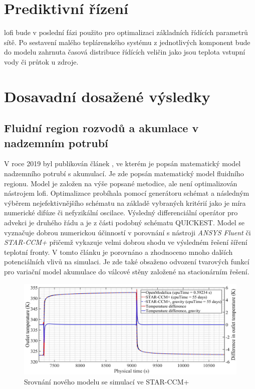 \section{Prediktivní řízení}
\label{sec:MPC}
\acrshort{lofi} bude v poslední fázi použito pro optimalizaci základních
řídících parametrů sítě. Po sestavení malého teplárenského systému z
jednotlivých komponent bude do modelu zahrnuta časová distribuce řídících
veličin jako jsou teplota vstupní vody či průtok u zdroje.
\section{Dosavadní dosažené výsledky}
\label{sec:Finished_parts}
\subsection{Fluidní region rozvodů a akumlace v nadzemním potrubí}
V roce 2019 byl publikován článek \cite{Kudela2019pipe}, ve kterém je popsán
matematický model nadzemního potrubí s akumulací. Je zde popsán matematický
model fluidního regionu. Model je založen na výše popsané metodice, ale není
optimalizován nástrojem \acrshort{lofi}. Optimalizace probíhala pomocí
generátoru schémat a následným výběrem nejefektivnějšího schématu na základě
vybraných kritérií jako je míra numerické difúze či nefyzikální oscilace.
Výsledný differenciální operátor pro advekci je druhého řádu a je z části
podobný schématu QUICKEST. Model se vyznačuje dobrou numerickou účinností v
porovnání s nástroji \textit{ANSYS Fluent} či \textit{\mbox{STAR-CCM+}} přičemž
vykazuje velmi dobrou shodu ve výsledném řešení šíření teplotní fronty. V tomto
článku je porovnáno a zhodnoceno mnoho dalších potenciálních vlivů na simulaci.
Je zde také obsaženo odvození tvarových funkcí pro variační model akumulace do
válcové stěny založené na stacionárním řešení.
\begin{figure}[h!]\centering
    \includegraphics[scale=0.7]{figures/pipe_CCM_OM}
  \caption{Srovnání nového modelu se simulací ve STAR-CCM+}
  \label{fig:OM_vs_CCM}
\end{figure}
